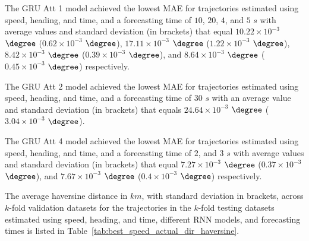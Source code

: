 The GRU Att 1 model achieved the lowest MAE for trajectories estimated using speed, heading, and time, and a forecasting time of $10$, $20$, $4$, and $5$ $s$ with average values and standard deviation (in brackets) that equal $10.22 \times 10^{-3}$ $\degree$ ($0.62 \times 10^{-3}$ $\degree$), $17.11 \times 10^{-3}$ $\degree$ ($1.22 \times 10^{-3}$ $\degree$), $8.42 \times 10^{-3}$ $\degree$ ($0.39 \times 10^{-3}$ $\degree$), and $8.64 \times 10^{-3}$ $\degree$ ($0.45 \times 10^{-3}$ $\degree$) respectively.

The GRU Att 2 model achieved the lowest MAE for trajectories estimated using speed, heading, and time, and a forecasting time of $30$ $s$ with an average value and standard deviation (in brackets) that equals $24.64 \times 10^{-3}$ $\degree$ ($3.04 \times 10^{-3}$ $\degree$).

The GRU Att 4 model achieved the lowest MAE for trajectories estimated using speed, heading, and time, and a forecasting time of $2$, and $3$ $s$ with average values and standard deviation (in brackets) that equal $7.27 \times 10^{-3}$ $\degree$ ($0.37 \times 10^{-3}$ $\degree$), and $7.67 \times 10^{-3}$ $\degree$ ($0.4 \times 10^{-3}$ $\degree$) respectively.

The average haversine distance in $km$, with standard deviation in brackets, across $k$-fold validation datasets for the trajectories in the $k$-fold testing datasets estimated using speed, heading, and time, different RNN models, and forecasting times is listed in Table~\ref{tab:best_speed_actual_dir_haversine}.

